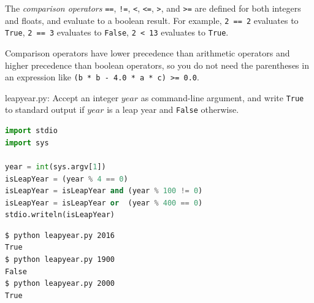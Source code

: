 \documentclass[8pt,a4paper,compress,handout]{beamer}
\begin{document}
\begin{frame}[fragile]
The \emph{comparison operators} \lstinline{==}, \lstinline{!=}, \lstinline{<}, \lstinline{<=}, \lstinline{>}, and \lstinline{>=} are defined for both integers and floats, and evaluate to a boolean result. For example, \lstinline{2 == 2} evaluates to \lstinline{True}, \lstinline{2 == 3} evaluates to \lstinline{False}, \lstinline{2 < 13} evaluates to \lstinline{True}. 

\bigskip

Comparison operators have lower precedence than arithmetic operators and higher precedence than boolean operators, so you do not need the parentheses in an expression like \lstinline{(b * b - 4.0 * a * c) >= 0.0}.
\end{frame}

\begin{frame}[fragile]
\begin{framed}
\tiny leapyear.py: Accept an integer $year$ as command-line argument, and write \lstinline{True} to standard output if $year$ is a leap year and \lstinline{False} otherwise. 
\end{framed}

\begin{lstlisting}[language=Python]
import stdio
import sys

year = int(sys.argv[1])
isLeapYear = (year % 4 == 0)
isLeapYear = isLeapYear and (year % 100 != 0)
isLeapYear = isLeapYear or  (year % 400 == 0)
stdio.writeln(isLeapYear)
\end{lstlisting}

\begin{lstlisting}[language={}]
$ python leapyear.py 2016
True
$ python leapyear.py 1900
False
$ python leapyear.py 2000
True
\end{lstlisting}
\end{frame}
\end{document}
